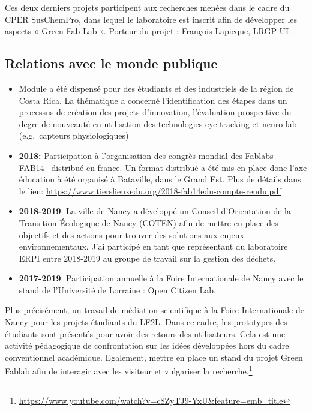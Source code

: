 \documentclass[
  11pt,
]{article}
\begin{document}
Ces deux derniers projets participent aux recherches menées dans le
cadre du CPER SusChemPro, dans lequel le laboratoire est inscrit afin de
développer les aspects « Green Fab Lab ». Porteur du projet : François
Lapicque, LRGP-UL.

\hypertarget{relations-avec-le-monde-publique}{%
\subsection{Relations avec le monde
publique}\label{relations-avec-le-monde-publique}}

\begin{itemize}
\item
  Module a été dispensé pour des étudiants et des industriels de la
  région de Costa Rica. La thématique a concerné l'identification des
  étapes dans un processus de création des projets d'innovation,
  l'évaluation prospective du degre de nouveauté en utilisation des
  technologies eye-tracking et neuro-lab (e.g.~capteurs physiologiques)
\item
  \textbf{2018:} Participation à l'organisation des congrès mondial des
  Fablabs --FAB14-- distribué en france. Un format distribué a été mis
  en place donc l'axe éducation à été organisé à Bataville, dans le
  Grand Est. Plus de détails dans le lien:
  \url{https://www.tierslieuxedu.org/2018-fab14edu-compte-rendu.pdf}
\item
  \textbf{2018-2019}: La ville de Nancy a développé un Conseil
  d'Orientation de la Transition Écologique de Nancy (COTEN) afin de
  mettre en place des objectifs et des actions pour trouver des
  solutions aux enjeux environnementaux. J'ai participé en tant que
  représentant du laboratoire ERPI entre 2018-2019 au groupe de travail
  sur la gestion des déchets.
\item
  \textbf{2017-2019}: Participation annuelle à la Foire Internationale
  de Nancy avec le stand de l'Université de Lorraine : Open Citizen Lab.
\end{itemize}

Plus précisément, un travail de médiation scientifique à la Foire
Internationale de Nancy pour les projets étudiants du LF2L. Dans ce
cadre, les prototypes des étudiants sont présentés pour avoir des
retours des utilisateurs. Cela est une activité pédagogique de
confrontation sur les idées développées hors du cadre conventionnel
académique. Egalement, mettre en place un stand du projet Green Fablab
afin de interagir avec les visiteur et vulgariser la
recherche.\footnote{\url{https://www.youtube.com/watch?v=c8ZyTJ9-YxU&feature=emb_title}}
\end{document}
